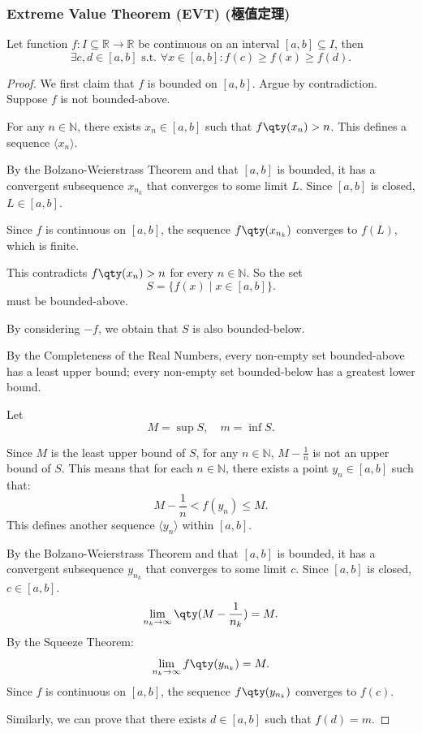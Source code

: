 \subsubsection{Extreme Value Theorem (EVT) (極值定理)}
Let function $f\colon I\subseteq\mathbb{R}\to\mathbb{R}$ be continuous on an interval $[a,b]\subseteq I$, then
\[\exists c,d \in [a, b] \text{\ s.t.\ }\forall x \in [a, b]\colon f(c)\geq f(x)\geq f(d).\]
\begin{proof}
We first claim that $f$ is bounded on $[a,b]$. Argue by contradiction. Suppose $f$ is not bounded-above.

For any $n\in\mathbb{N}$, there exists $x_n\in [a,b]$ such that $f\qty(x_n)>n$. This defines a sequence $\langle x_n\rangle$.

By the Bolzano-Weierstrass Theorem and that $[a,b]$ is bounded, it has a convergent subsequence $x_{n_k}$ that converges to some limit $L$. Since $[a,b]$ is closed, $L\in [a,b]$.

Since $f$ is continuous on $[a,b]$, the sequence $f\qty(x_{n_k})$ converges to $f(L)$, which is finite.

This contradicts $f\qty(x_n)>n$ for every $n\in\mathbb{N}$. So the set
\[S=\{f(x)\mid x\in [a,b]\}.\]
must be bounded-above.

By considering $-f$, we obtain that $S$ is also bounded-below.

By the Completeness of the Real Numbers, every non-empty set bounded-above has a least upper bound; every non-empty set bounded-below has a greatest lower bound.

Let
\[M=\sup S,\quad m=\inf S.\]

Since $M$ is the least upper bound of $S$, for any $n\in\mathbb{N}$, $M-\frac{1}{n}$ is not an upper bound of $S$. This means that for each $n\in\mathbb{N}$, there exists a point $y_n\in [a,b]$ such that:
\[M-\frac{1}{n}<f(y_n)\leq M.\]
This defines another sequence $\langle y_n\rangle$ within $[a, b]$.

By the Bolzano-Weierstrass Theorem and that $[a,b]$ is bounded, it has a convergent subsequence $y_{n_k}$ that converges to some limit $c$. Since $[a,b]$ is closed, $c\in [a,b]$.
\[\lim_{n_k\to \infty}\qty(M - \frac{1}{n_k}) = M.\]
By the Squeeze Theorem:
\[\lim_{n_k \to \infty} f\qty(y_{n_k}) = M.\]
Since $f$ is continuous on $[a,b]$, the sequence $f\qty(y_{n_k})$ converges to $f(c)$.

Similarly, we can prove that there exists $d\in [a,b]$ such that $f(d)=m$.
\end{proof}
